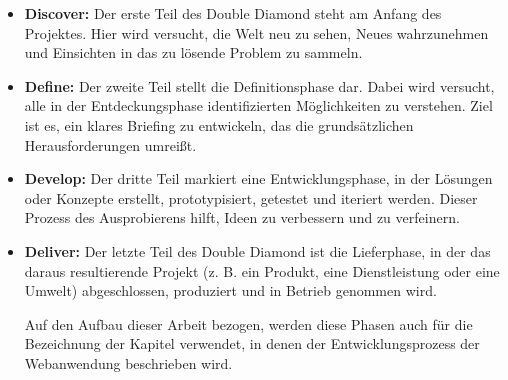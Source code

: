   \begin{itemize}[label={}]
    \item \textbf{Discover:} Der erste Teil des Double Diamond steht am Anfang des Projektes. Hier wird versucht, die Welt neu zu sehen, Neues wahrzunehmen und Einsichten in das zu lösende Problem zu sammeln.

    \item \textbf{Define:} Der zweite Teil stellt die Definitionsphase dar. Dabei wird versucht, alle in der Entdeckungsphase identifizierten Möglichkeiten zu verstehen. Ziel ist es, ein klares Briefing zu entwickeln, das die grundsätzlichen Herausforderungen umreißt.

    \item \textbf{Develop:} Der dritte Teil markiert eine Entwicklungsphase, in der Lösungen oder Konzepte erstellt, prototypisiert, getestet und iteriert werden. Dieser Prozess des Ausprobierens hilft, Ideen zu verbessern und zu verfeinern.

    \item \textbf{Deliver:} Der letzte Teil des Double Diamond ist die Lieferphase, in der das daraus resultierende Projekt (z. B. ein Produkt, eine Dienstleistung oder eine Umwelt) abgeschlossen, produziert und in Betrieb genommen wird.

  Auf den Aufbau dieser Arbeit bezogen, werden diese Phasen auch für die Bezeichnung der Kapitel verwendet, in denen der Entwicklungsprozess der Webanwendung beschrieben wird. 

  \end{itemize}

